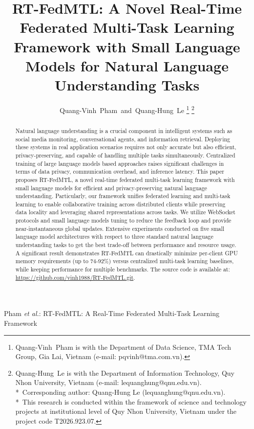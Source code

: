 \documentclass[journal]{IEEEtran}
\begin{document}
\title{RT-FedMTL: A Novel Real-Time Federated Multi-Task Learning Framework with Small Language Models for Natural Language Understanding Tasks}

\author{Quang-Vinh~Pham~and~Quang-Hung~Le
\thanks{Quang-Vinh~Pham is with the Department of Data Science, TMA Tech Group, Gia Lai, Vietnam (e-mail: pqvinh@tma.com.vn).}%
\thanks{Quang-Hung~Le is with the Department of Information Technology, Quy Nhon University, Vietnam (e-mail: lequanghung@qnu.edu.vn).\\
*~Corresponding author: Quang-Hung Le (lequanghung@qnu.edu.vn).\\
*~This research is conducted within the framework of science and technology projects at institutional level of Quy Nhon University, Vietnam under the project code T2026.923.07.}}

{Pham \MakeLowercase{\textit{et al.}}: RT-FedMTL: A Real-Time Federated Multi-Task Learning Framework}

\maketitle

\begin{abstract}

Natural language understanding is a crucial component in intelligent systems such as social media monitoring, conversational agents, and information retrieval. Deploying these systems in real application scenarios requires not only accurate but also efficient, privacy-preserving, and capable of handling multiple tasks simultaneously. Centralized training of large language models based approaches raises significant challenges in terms of data privacy, communication overhead, and inference latency. This paper proposes RT-FedMTL, a novel real-time federated multi-task learning framework with small language models for efficient and privacy-preserving natural language understanding. Particularly, our framework unifies federated learning and multi-task learning to enable collaborative training across distributed clients while preserving data locality and leveraging shared representations across tasks. We utilize WebSocket protocols and small language models tuning to reduce the feedback loop and provide near-instantaneous global updates. Extensive experiments conducted on five small language model architectures with respect to three standard natural language understanding tasks to get the best trade-off between performance and resource usage. A significant result demonstrates RT-FedMTL can drastically minimize per-client GPU memory requirements (up to 74-92\%) versus centralized multi-task learning baselines, while keeping performance for multiple benchmarks. The source code is available at: \url{https://github.com/vinh1988/RT-FedMTL.git}.
\end{abstract}
\end{document}
